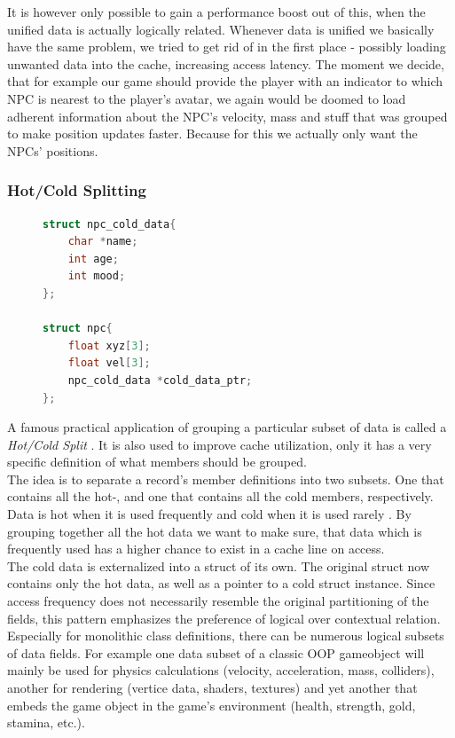 It is however only possible to gain a performance boost out of this, when the unified data is actually logically related. Whenever data is unified we basically have the same problem, we tried to get rid of in the first place - possibly loading unwanted data into the cache, increasing access latency. The moment we decide, that for example our game should provide the player with an indicator to which NPC is nearest to the player's avatar, we again would be doomed to load adherent information about the NPC's velocity, mass and stuff that was grouped to make position updates faster. Because for this we actually only want the NPCs' positions.
\newpage
\subsubsection{Hot/Cold Splitting}
\begin{figure}
\begin{lstlisting}[language=C++,numbers=none,name={The NPC class splitted into hot/cold data},label={hcsplit_npc}]
struct npc_cold_data{
	char *name;
	int age;
	int mood;
};

struct npc{
	float xyz[3];
	float vel[3];
	npc_cold_data *cold_data_ptr;
};
\end{lstlisting}
\end{figure}
A famous practical application of grouping a particular subset of data is called a \textit{Hot/Cold Split} . It is also used to improve cache utilization, only it has a very specific definition of what members should be grouped.\\
The idea is to separate a record's member definitions into two subsets. One that contains all the hot-, and one that contains all the cold members, respectively. Data is hot when it is used frequently and cold when it is used rarely . By grouping together all the hot data we want to make sure, that data which is frequently used has a higher chance to exist in a cache line on access.\\
The cold data is externalized into a struct of its own. The original struct now contains only the hot data, as well as a pointer to a cold struct instance. Since access frequency does not necessarily resemble the original partitioning of the fields, this pattern emphasizes the preference of logical over contextual relation.\\
Especially for monolithic class definitions, there can be numerous logical subsets of data fields. For example one data subset of a classic OOP gameobject will mainly be used for physics calculations (velocity, acceleration, mass, colliders), another for rendering (vertice data, shaders, textures) and yet another that embeds the game object in the game's environment (health, strength, gold, stamina, etc.).\\
